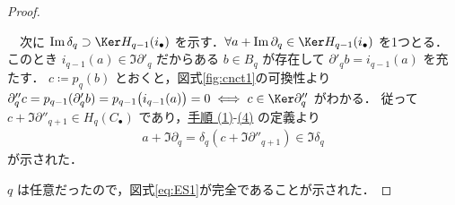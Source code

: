 \documentclass[algtopo_main]{subfiles}
\begin{document}
\begin{proof}
\begin{description}
    　次に $\Im \delta_q \supset \Ker H_{q-1}(i_\bullet)$ を示す．$\forall a + \Im \partial_q \in \Ker H_{q-1}(i_\bullet)$ を1つとる．このとき $i_{q-1}(a) \in \Im \partial'_q$ だからある $b \in B_q$ が存在して $\partial'_q b = i_{q-1}(a)$ を充たす．
    $c \coloneqq p_q(b)$ とおくと，図式\ref{fig:cnct1}の可換性より $\partial''_q c = p_{q-1} ( \partial'_q b) = p_{q-1} \bigl( i_{q-1}(a) \bigr) = 0 \iff c \in \Ker \partial''_q$ がわかる．
    従って $c + \Im \partial''_{q+1} \in H_q (C_\bullet)$ であり，\hyperref[pro:1]{手順 (1)}-\hyperref[pro:4]{(4)} の定義より
    \begin{align}
        a + \Im \partial_q = \delta_q (c + \Im \partial''_{q+1}) \in \Im \delta_q
    \end{align}
    が示された．
\end{description}
$q$ は任意だったので，図式\eqref{eq:ES1}が完全であることが示された．
\end{proof}
\end{document}
